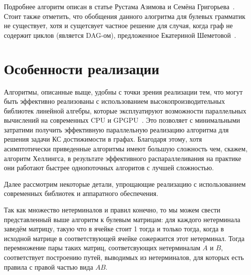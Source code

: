 Подробнее алгоритм описан в статье Рустама Азимова и Семёна Григорьева~\cite{565CECD7E8F5C6063935B41DB41797AA37D53B04}. Стоит также отметить, что обобщения данного алогритма для булевых грамматик не существует, хотя и сущетсвует частное решение для случая, когда граф не содержит циклов (является DAG-ом), предложенное Екатериной Шеметовой~\cite{Shemetova2019}.

\section{Особенности реализации}

Алгоритмы, описанные выще, удобны с точки зрения реализации тем, что могут быть эффективно реализованы с использованием высокопроизводительных библиотек линейной алгебры, которые эксплуатируют возможности параллельных вычислений на современных CPU и  GPGPU~\cite{Mishin:2019:ECP:3327964.3328503}. 
Это позволяет с минимальными затратими получить эффективную параллельную реализацию алгоритма для решения задачи КС достижимости в графах. 
Благодаря этому, хотя асимптотически приведенные алгоритмы имеют большую сложность чем, скажем, алгоритм Хеллингса, в результате эффективного распараллеливания на практике они работают быстрее однопоточных алгоритов с лучшей сложностью.

Далее рассмотрим некоторые детали, упрощающие реализацию с использованием современных библиотек и аппаратного обеспечения.

Так как множество нетерминалов и правил конечно, то мы можем свести представленный выше алгоритм к булевым матрицам: для каждого нетерминала заведём матрицу, такую что в ячейке стоит 1 тогда и только тогда, когда в исходной матрице в соответствующей ячейке сожержится этот нетерминал.
Тогда перемножение пары таких матриц, соответсвующих нетерминалам $A$ и $B$, соответствует построению путей, выводимых из нетерминалов, для которых есть правила с правой частью вида $A B$. 


